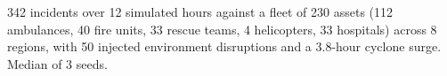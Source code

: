 342 incidents over 12 simulated hours against a fleet of 230 assets (112 ambulances, 40 fire units, 33 rescue teams, 4 helicopters, 33 hospitals) across 8 regions, with 50 injected environment disruptions and a 3.8-hour cyclone surge. Median of 3 seeds.